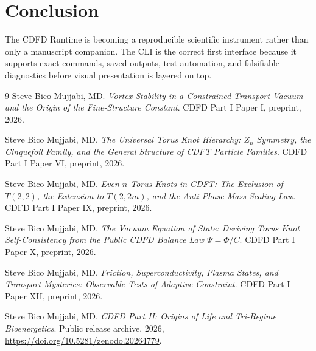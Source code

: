 \documentclass[12pt,a4paper]{article}
\begin{document}
\section{Conclusion}
The CDFD Runtime is becoming a reproducible scientific instrument rather than
only a manuscript companion. The CLI is the correct first interface because it
supports exact commands, saved outputs, test automation, and falsifiable
diagnostics before visual presentation is layered on top.
\begin{thebibliography}{9}
Steve Bico Mujjabi, MD. \emph{Vortex Stability in a Constrained Transport Vacuum and the Origin of the Fine-Structure Constant}. CDFD Part I Paper I, preprint, 2026.

Steve Bico Mujjabi, MD. \emph{The Universal Torus Knot Hierarchy: $Z_n$ Symmetry, the Cinquefoil Family, and the General Structure of CDFT Particle Families}. CDFD Part I Paper VI, preprint, 2026.

Steve Bico Mujjabi, MD. \emph{Even-$n$ Torus Knots in CDFT: The Exclusion of $T(2,2)$, the Extension to $T(2,2m)$, and the Anti-Phase Mass Scaling Law}. CDFD Part I Paper IX, preprint, 2026.

Steve Bico Mujjabi, MD. \emph{The Vacuum Equation of State: Deriving Torus Knot Self-Consistency from the Public CDFD Balance Law $\Psi = \Phi/C$}. CDFD Part I Paper X, preprint, 2026.

Steve Bico Mujjabi, MD. \emph{Friction, Superconductivity, Plasma States, and Transport Mysteries: Observable Tests of Adaptive Constraint}. CDFD Part I Paper XII, preprint, 2026.

Steve Bico Mujjabi, MD. \emph{CDFD Part II: Origins of Life and Tri-Regime Bioenergetics}. Public release archive, 2026, \url{https://doi.org/10.5281/zenodo.20264779}.
\end{thebibliography}
\end{document}
